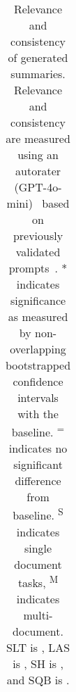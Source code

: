 \begin{table}[t]
\begin{tabular}{l c c | c c | c c | c c}
    \end{tabular}
    \caption{Relevance and consistency of generated summaries. Relevance and consistency are measured using an autorater (GPT-4o-mini)~\cite{DBLP:conf/emnlp/LiuIXWXZ23} based on previously validated prompts~\cite{DBLP:journals/corr/abs-2410-23463}. 
    * indicates significance as measured by non-overlapping bootstrapped confidence intervals with the baseline. \textsuperscript{=} indicates no significant difference from baseline.
    \textsuperscript{S} indicates single document tasks, \textsuperscript{M} indicates multi-document. SLT is \sqa{}, LAS is \las{}, SH is \smh{}, and SQB is \ops{}.}
    \vspace{-10pt}
    \label{tab:abstractive_results}
\end{table}
